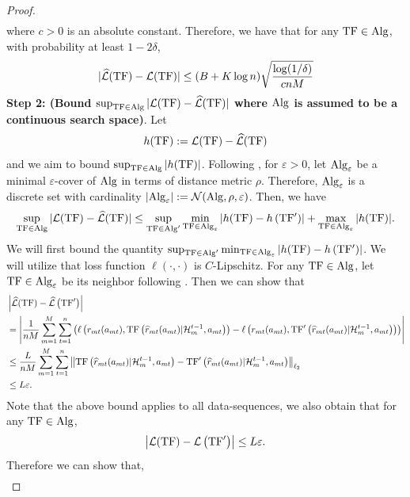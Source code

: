 \documentclass[10pt]{article}
\theoremstyle{plain}
\theoremstyle{definition}
\theoremstyle{remark}
\begin{document}
\begin{proof}
\begin{align*}
\end{align*}
where $c>0$ is an absolute constant. Therefore, we have that for any $\mathrm{TF} \in \mathrm{Alg}$, with probability at least $1-2 \delta$,
\begin{align}
    |\widehat{\mathcal{L}}(\mathrm{TF})-\mathcal{L}(\mathrm{TF})| \leq(B+K \log n) \sqrt{\frac{\log (1 / \delta)}{c n M}} \label{eq:conc-bound}
\end{align}
\textbf{Step 2: (Bound $\sup _{\mathrm{TF} \in \mathrm{Alg}}|\mathcal{L}(\mathrm{TF})-\widehat{\mathcal{L}}(\mathrm{TF})|$ where $\mathrm{Alg}$ is assumed to be a continuous search space)}. Let
$$
h(\mathrm{TF}):=\mathcal{L}(\mathrm{TF})-\widehat{\mathcal{L}}(\mathrm{TF})$$
and we aim to bound $\sup _{\mathrm{TF} \in \mathrm{Alg}}|h(\mathrm{TF})|$. Following , for $\varepsilon>0$, let $\mathrm{Alg}_{\varepsilon}$ be a minimal $\varepsilon$-cover of $\mathrm{Alg}$ in terms of distance metric $\rho$. Therefore, $\mathrm{Alg}_{\varepsilon}$ is a discrete set with cardinality $\left|\mathrm{Alg}_{\varepsilon}\right|:=\mathcal{N}(\mathrm{Alg}, \rho, \varepsilon)$. Then, we have
\begin{align*}
    \sup _{\mathrm{TF} \in \mathrm{Alg}}|\mathcal{L}(\mathrm{TF})-\widehat{\mathcal{L}}(\mathrm{TF})| \leq \sup _{\mathrm{TF} \in \mathrm{Alg}^{\prime}} \min _{\mathrm{TF} \in \mathrm{Alg}_{\varepsilon}}\left|h(\mathrm{TF})-h\left(\mathrm{TF}{ }^{\prime}\right)\right|+\max _{\mathrm{TF} \in \mathrm{Alg}_{\varepsilon}}|h(\mathrm{TF})| .
\end{align*}
We will first bound the quantity $\sup _{\mathrm{TF} \in \mathrm{Alg}^{\prime}} \min _{\mathrm{TF} \in \mathrm{Alg}_{\varepsilon}}\left|h(\mathrm{TF})-h\left(\mathrm{TF}{ }^{\prime}\right)\right|$.
We will utilize that loss function $\ell(\cdot, \cdot)$ is $C$-Lipschitz. For any $\mathrm{TF} \in \mathrm{Alg}$, let $\mathrm{TF} \in \mathrm{Alg}_{\varepsilon}$ be its neighbor following . Then
we can show that
\begin{align*}
&\left|\widehat{\mathcal{L}}(\mathrm{TF})-\widehat{\mathcal{L}}\left(\mathrm{TF}^{\prime}\right)\right| \\
& =\left|\frac{1}{n M} \sum_{m=1}^M \sum_{t=1}^n\left(\ell\left(r_{mt}(a_{mt}), \mathrm{TF}\left(\widehat{r}_{mt}(a_{mt})|\mathcal{H}_m^{t-1}, a_{m t}\right)\right)-\ell\left(r_{mt}(a_{mt}), \mathrm{TF}'\left(\widehat{r}_{mt}(a_{mt})|\mathcal{H}_m^{t-1}, a_{m t}\right)\right)\right)\right| \\
& \leq \frac{L}{n M} \sum_{m=1}^M \sum_{t=1}^n\left\|\mathrm{TF}\left(\widehat{r}_{mt}(a_{mt})|\mathcal{H}_m^{t-1}, a_{m t}\right)-\mathrm{TF}'\left(\widehat{r}_{mt}(a_{mt})|\mathcal{H}_m^{t-1}, a_{m t}\right)\right\|_{\ell_2} \\
& \leq L \varepsilon .
\end{align*}
Note that the above bound applies to all data-sequences, we also obtain that for any $\mathrm{TF} \in \mathrm{Alg}$,
$$
\left|\mathcal{L}(\mathrm{TF})-\mathcal{L}\left(\mathrm{TF}^{\prime}\right)\right| \leq L \varepsilon .
$$
Therefore we can show that,
\begin{align}

\end{align}
\end{proof}
\end{document}
